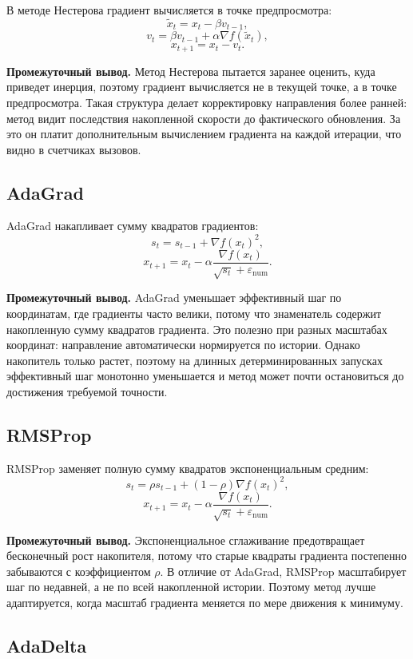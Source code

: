 ﻿\documentclass[14pt,a4paper]{extarticle}
\begin{document}
В методе Нестерова градиент вычисляется в точке предпросмотра:
\[
    \tilde{x}_t=x_t-\beta v_{t-1},
\]
\[
    v_t=\beta v_{t-1}+\alpha\nabla f(\tilde{x}_t),
\]
\[
    x_{t+1}=x_t-v_t.
\]

\textbf{Промежуточный вывод.} Метод Нестерова пытается заранее оценить, куда приведет инерция, поэтому градиент вычисляется не в текущей точке, а в точке предпросмотра. Такая структура делает корректировку направления более ранней: метод видит последствия накопленной скорости до фактического обновления. За это он платит дополнительным вычислением градиента на каждой итерации, что видно в счетчиках вызовов.

\subsection{AdaGrad}

AdaGrad накапливает сумму квадратов градиентов:
\[
    s_t=s_{t-1}+\nabla f(x_t)^2,
\]
\[
    x_{t+1}=x_t-\alpha\frac{\nabla f(x_t)}{\sqrt{s_t}+\varepsilon_{\mathrm{num}}}.
\]

\textbf{Промежуточный вывод.} AdaGrad уменьшает эффективный шаг по координатам, где градиенты часто велики, потому что знаменатель содержит накопленную сумму квадратов градиента. Это полезно при разных масштабах координат: направление автоматически нормируется по истории. Однако накопитель только растет, поэтому на длинных детерминированных запусках эффективный шаг монотонно уменьшается и метод может почти остановиться до достижения требуемой точности.

\subsection{RMSProp}

RMSProp заменяет полную сумму квадратов экспоненциальным средним:
\[
    s_t=\rho s_{t-1}+(1-\rho)\nabla f(x_t)^2,
\]
\[
    x_{t+1}=x_t-\alpha\frac{\nabla f(x_t)}{\sqrt{s_t}+\varepsilon_{\mathrm{num}}}.
\]

\textbf{Промежуточный вывод.} Экспоненциальное сглаживание предотвращает бесконечный рост накопителя, потому что старые квадраты градиента постепенно забываются с коэффициентом $\rho$. В отличие от AdaGrad, RMSProp масштабирует шаг по недавней, а не по всей накопленной истории. Поэтому метод лучше адаптируется, когда масштаб градиента меняется по мере движения к минимуму.

\subsection{AdaDelta}
\end{document}
